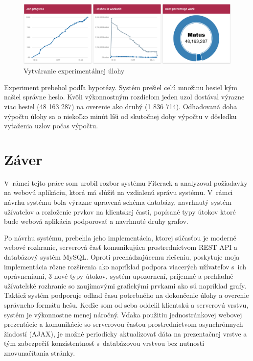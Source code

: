 \documentclass[zadani,slovak]{fitthesis}
\begin{document}
\begin{figure}[H]
    \centering
    \includegraphics[scale=0.4]{obrazky/exp3.PNG}
    \caption{Vytváranie experimentálnej úlohy}
    \label{fig:exp3}
\end{figure}
\noindent
Experiment prebehol podľa hypotézy. Systém prešiel celú množinu hesiel kým našiel správne heslo. Kvôli výkonnostným rozdielom jeden uzol dostával výrazne viac hesiel (48 163 287) na overenie ako druhý (1 836 714). Odhadovaná doba výpočtu úlohy sa o niekoľko minút líši od skutočnej doby výpočtu v dôsledku vyťaženia uzlov počas výpočtu.



\chapter{Záver}\label{zaver}
V~rámci tejto práce som urobil rozbor systému Fitcrack a analyzoval požiadavky na webovú aplikáciu, ktorá má slúžiť na vzdialenú správu systému. V~rámci návrhu systému bola výrazne upravená schéma databázy, navrhnutý systém užívateľov a rozloženie prvkov na klientskej časti, popísané typy útokov ktoré bude webová aplikácia podporovať a navrhnuté druhy grafov.

Po návrhu systému, prebehla jeho implementácia, ktorej súčasťou je moderné webové rozhranie, serverová časť komunikujúca prostredníctvom REST API a databázový systém MySQL. Oproti prechádzajúcemu riešeniu, poskytuje moja implementácia rôzne rozšírenia ako napríklad podpora viacerých užívateľov s~ich oprávneniami, 3 nové typy útokov, systém upozornení, príjemné a prehľadné užívateľské rozhranie so zaujímavými grafickými prvkami ako sú napríklad grafy. Taktiež systém podporuje odhad času potrebného na dokončenie úlohy a overenie správneho formátu hešu. Keďže som od seba oddelil klientskú a serverovú vrstvu, systém je výkonnostne menej náročný. Vďaka použitiu jednostránkovej webovej prezentácie a komunikácie so serverovou časťou prostredníctvom asynchrónnych žiadostí (AJAX), je možné periodicky aktualizovať dáta na prezentačnej vrstve a tým zabezpečiť konzistentnosť s~databázovou vrstvou bez nutnosti znovunačítania stránky.
\end{document}
